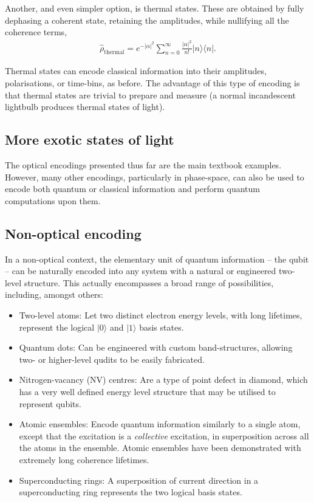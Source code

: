 \documentclass[aps,rmp,twocolumn,amsmath,amssymb,nofootinbib,superscriptaddress,longbibliography,floatfix]{revtex4-1}
\newcommand{\bra}[1]{\langle#1|}
\newcommand{\ket}[1]{|#1\rangle}
\begin{document}
Another, and even simpler option, is thermal states. These are obtained by fully dephasing a coherent state, retaining the amplitudes, while nullifying all the coherence terms,
\begin{align}
\hat\rho_\mathrm{thermal} = e^{-|\alpha|^2} \sum_{n=0}^\infty \frac{|\alpha|^2}{n!}\ket{n}\bra{n}.
\end{align}

Thermal states can encode classical information into their amplitudes, polarisations, or time-bins, as before. The advantage of this type of encoding is that thermal states are trivial to prepare and measure (a normal incandescent lightbulb produces thermal states of light).

%
%

\subsection{More exotic states of light} \label{sec:exotic}

The optical encodings presented thus far are the main textbook examples. However, many other encodings, particularly in phase-space, can also be used to encode both quantum or classical information and perform quantum computations upon them.

%
%

\subsection{Non-optical encoding}

In a non-optical context, the elementary unit of quantum information -- the qubit -- can be naturally encoded into any system with a natural or engineered two-level structure. This actually encompasses a broad range of possibilities, including, amongst others:
\begin{itemize}
\item Two-level atoms: Let two distinct electron energy levels, with long lifetimes, represent the logical $\ket{0}$ and $\ket{1}$ basis states.
\item Quantum dots: Can be engineered with custom band-structures, allowing two- or higher-level qudits to be easily fabricated.
\item Nitrogen-vacancy (NV) centres: Are a type of point defect in diamond, which has a very well defined energy level structure that may be utilised to represent qubits.
\item Atomic ensembles: Encode quantum information similarly to a single atom, except that the excitation is a \emph{collective} excitation, in superposition across all the atoms in the ensemble. Atomic ensembles have been demonstrated with extremely long coherence lifetimes.
\item Superconducting rings: A superposition of current direction in a superconducting ring represents the two logical basis states.
\end{itemize}
\end{document}
